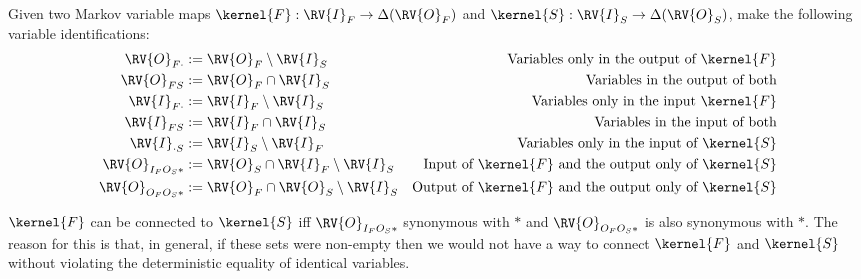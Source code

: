 Given two Markov variable maps $\kernel{F}:\RV{I}_F\to\Delta(\RV{O}_F)$ and $\kernel{S}:\RV{I}_S\to\Delta(\RV{O}_S)$, make the following variable identifications:
\begin{align}
    \RV{O}_{F\cdot}&:=\RV{O}_F\setminus\RV{I}_S &\text{Variables only in the output of } \kernel{F}\\
    \RV{O}_{FS}&:=\RV{O}_F\cap\RV{I}_S &\text{Variables in the output of both}\\
    \RV{I}_{F\cdot} &:= \RV{I}_F\setminus \RV{I}_S &\text{Variables only in the input } \kernel{F}\\
    \RV{I}_{FS}&:= \RV{I}_F\cap\RV{I}_S &\text{Variables in the input of both}\\
    \RV{I}_{\cdot S}&:= \RV{I}_S\setminus \RV{I}_F &\text{Variables only in the input of }\kernel{S} \\
    \RV{O}_{I_FO_S*}&:=\RV{O}_S\cap \RV{I}_F\setminus \RV{I}_S &\text{Input of }\kernel{F}\text{ and the output only of }\kernel{S}\\
    \RV{O}_{O_FO_S*} &:= \RV{O}_F\cap\RV{O}_S\setminus \RV{I}_S&\text{Output of }\kernel{F}\text{ and the output only of }\kernel{S}\\
\end{align}

$\kernel{F}$ can be connected to $\kernel{S}$ iff $\RV{O}_{I_FO_S*}$ synonymous with $*$ and $\RV{O}_{O_FO_S*}$ is also synonymous with $*$. The reason for this is that, in general, if these sets were non-empty then we would not have a way to connect $\kernel{F}$ and $\kernel{S}$ without violating the deterministic equality of identical variables.

